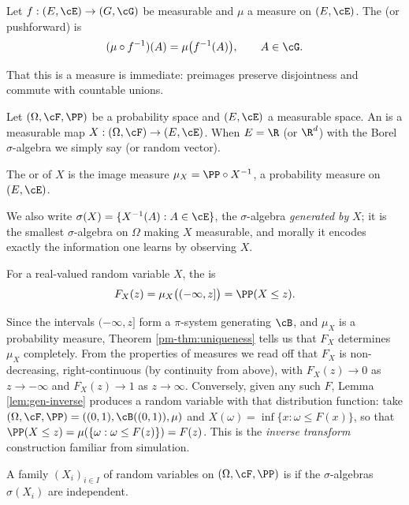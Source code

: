 \begin{definition}
	Let $f : (E,\cE) \to (G,\cG)$ be measurable and $\mu$ a measure on $(E,\cE)$. The  (or pushforward) is
	$$
	(\mu \circ f^{-1})(A) = \mu\big(f^{-1}(A)\big), \qquad A \in \cG.
	$$
\end{definition}

That this is a measure is immediate: preimages preserve disjointness and commute with countable unions.

\begin{definition}
	Let $(\Omega, \cF, \PP)$ be a probability space and $(E,\cE)$ a measurable space. An  is a measurable map $X : (\Omega, \cF) \to (E,\cE)$. When $E = \R$ (or $\R^d$) with the Borel $\sigma$-algebra we simply say  (or random vector).

	The  or  of $X$ is the image measure $\mu_X = \PP \circ X^{-1}$, a probability measure on $(E,\cE)$.
\end{definition}

We also write $\sigma(X) = \{X^{-1}(A) : A \in \cE\}$, the $\sigma$-algebra \emph{generated by} $X$; it is the smallest $\sigma$-algebra on $\Omega$ making $X$ measurable, and morally it encodes exactly the information one learns by observing $X$.

\begin{definition}
	For a real-valued random variable $X$, the  is
	$$
	F_X(z) = \mu_X\big((-\infty,z]\big) = \PP(X \leq z).
	$$
\end{definition}

Since the intervals $(-\infty,z]$ form a $\pi$-system generating $\cB$, and $\mu_X$ is a probability measure, Theorem \ref{pm-thm:uniqueness} tells us that $F_X$ determines $\mu_X$ completely. From the properties of measures we read off that $F_X$ is non-decreasing, right-continuous (by continuity from above), with $F_X(z) \to 0$ as $z \to -\infty$ and $F_X(z) \to 1$ as $z \to \infty$. Conversely, given any such $F$, Lemma \ref{lem:gen-inverse} produces a random variable with that distribution function: take $(\Omega,\cF,\PP) = ((0,1), \cB((0,1)), \mu)$ and $X(\omega) = \inf\{x : \omega \leq F(x)\}$, so that $\PP(X \leq z) = \mu(\{\omega : \omega \leq F(z)\}) = F(z)$. This is the \emph{inverse transform} construction familiar from simulation.

\begin{definition}
	A family $(X_i)_{i \in I}$ of random variables on $(\Omega,\cF,\PP)$ is  if the $\sigma$-algebras $\sigma(X_i)$ are independent.
\end{definition}

